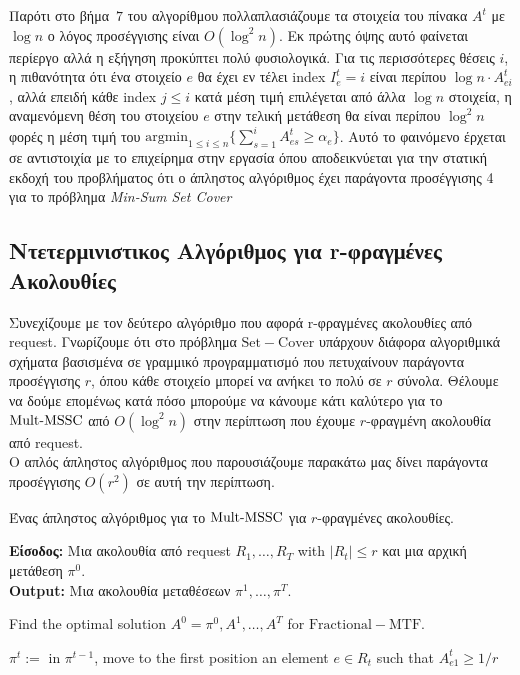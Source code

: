 \noindent Παρότι στο βήμα~$7$ του αλγορίθμου πολλαπλασιάζουμε τα στοιχεία του πίνακα $A^t$ με $\log n$ ο λόγος προσέγγισης είναι  $O(\log^2 n)$. Εκ πρώτης όψης αυτό φαίνεται περίεργο αλλά η εξήγηση προκύπτει πολύ φυσιολογικά. Για τις περισσότερες θέσεις $i$, η πιθανότητα ότι ένα στοιχείο $e$ θα έχει εν τέλει index $I_e^t = i$ είναι περίπου $\log n \cdot A_{ei}^t$, αλλά επειδή κάθε index $j \leq i$ κατά μέση τιμή επιλέγεται από άλλα $\log n$ στοιχεία, η αναμενόμενη θέση του στοιχείου $e$ στην τελική μετάθεση θα είναι περίπου $ \log^2 n$ φορές η μέση τιμή του
$\mathrm{argmin}_{1\leq i \leq n} \{ \sum_{s=1}^i A_{es}^t \geq \alpha_e\}$. Αυτό το φαινόμενο έρχεται σε αντιστοιχία με το επιχείρημα στην εργασία \cite{FLT04} όπου αποδεικνύεται για την στατική εκδοχή του προβλήματος ότι ο άπληστος αλγόριθμος έχει παράγοντα προσέγγισης 4 για το πρόβλημα \textit{Min-Sum Set Cover}

\subsection{Ντετερμινιστικος Αλγόριθμος για r-φραγμένες Ακολουθίες}

Συνεχίζουμε με τον δεύτερο αλγόριθμο που αφορά r-φραγμένες ακολουθίες από request. Γνωρίζουμε ότι στο πρόβλημα $\mathrm{Set-Cover}$ υπάρχουν διάφορα αλγοριθμικά σχήματα βασισμένα σε γραμμικό προγραμματισμό που πετυχαίνουν παράγοντα προσέγγισης $r$, όπου κάθε στοιχείο μπορεί να ανήκει το πολύ σε $r$ σύνολα. Θέλουμε να δούμε επομένως κατά πόσο μπορούμε να κάνουμε κάτι καλύτερο για το $\mathrm{Mult}\text{-}\mathrm{MSSC}$ από $O(\log^2 n)$ στην περίπτωση που έχουμε $r$-φραγμένη ακολουθία από request. \\

Ο απλός άπληστος αλγόριθμος που παρουσιάζουμε παρακάτω μας δίνει παράγοντα προσέγγισης $O(r^2)$ σε αυτή την περίπτωση.

\begin{algorithm}[H]
  \caption{Ένας άπληστος αλγόριθμος για το $\mathrm{Mult}\text{-}\mathrm{MSSC}$ για $r$-φραγμένες ακολουθίες.}\label{alg:greedy_rounding}
  \textbf{Είσοδος:} Μια ακολουθία από request $R_1,\ldots,R_T$ with $|R_t| \leq r$ και μια αρχική μετάθεση $\pi^0$.\\
  \textbf{Output:} Μια ακολουθία μεταθέσεων $\pi^1,\ldots,\pi^T$.

 \begin{algorithmic}[1]
 \STATE Find the optimal solution $A^0=\pi^0,A^1,\ldots,A^T$ for $\mathrm{Fractional-MTF}$. 

 
              
        \STATE $\pi^t:=$ in $\pi^{t-1}$, move to the first position an element $e \in R_t$
        such that $A_{e1}^t \geq 1/r$
\ENDFOR
  \end{algorithmic}
\end{algorithm}

